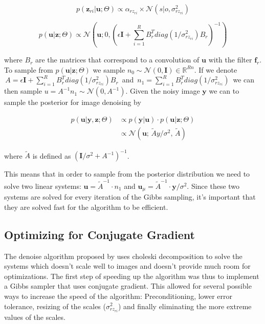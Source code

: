 \documentclass{article}
\begin{document}
\begin{equation}
	p(\textbf{z}_{ri}|\textbf{u};\Theta) \propto \alpha_{rz_{ri}} \times 
	\mathcal{N}(s|o, \sigma^2_{rz_{ri}})
\end{equation}

\begin{equation}
	p(\textbf{u}|\textbf{z};\Theta) \propto \mathcal{N}\left(\textbf{u}; 
	0, \left( \epsilon \textbf{I} + \sum_{i=1}^{R}B_r^T 
	diag(1/\sigma^2_{rz_{ri}}) B_r \right)^{-1} \right)
\end{equation}

where $B_r$ are the matrices that correspond to a convolution of 
$\textbf{u}$ with the filter $\textbf{f}_r$. To sample from 
$p(\textbf{u}|\textbf{z};\Theta)$ we sample $n_0 \sim \mathcal{N}(0, 
\textbf{I}) \in \mathbb{R}^{Rn}$. If we denote $\,A = \epsilon 
\textbf{I} + \sum_{i=1}^{R} B_r^T diag(1/\sigma^2_{rz_{ri}}) B_r\,$ and 
$\,n_1 = \sum_{i=1}^{R} B_r^T diag(1/\sigma^2_{rz_{ri}})\,$ we can then 
sample $u = A^{-1} n_1 \sim \mathcal{N}(0, A^{-1})$. Given the noisy 
image $\textbf{y}$ we can to sample the posterior for image denoising by

\begin{align}
	p(\textbf{u}| \textbf{y}, \textbf{z}; \Theta) & \propto 
	p(\textbf{y}|\textbf{u}) \cdot p(\textbf{u}|\textbf{z};\Theta) \\
	& \propto \mathcal{N} \left( \textbf{u} ; \, \tilde{A} y / \sigma^2, 
	\, \tilde{A}\right)
\end{align}

where $\tilde{A}$ is defined as $(\textbf{I}/\sigma^2 + A^{-1})^{-1}$.

This means that in order to sample from the posterior distribution we 
need to solve two linear systems: $\textbf{u} = \tilde{A}^{-1} \cdot 
n_1$ and $\textbf{u}_{\mu} = \tilde{A}^{-1} \cdot \textbf{y}/\sigma^2$.  
Since these two systems are solved for every iteration of the Gibbs 
sampling, it's important that they are solved fast for the algorithm to 
be efficient.  

\subsection{Optimizing for Conjugate Gradient}

The denoise algorithm proposed by \citep{uwe} uses choleski 
decomposition to solve the systems which doesn't scale well to images 
and doesn't provide much room for optimizations. The first step of 
speeding up the algorithm was thus to implement a Gibbs sampler that 
uses conjugate gradient. This allowed for several possible ways to 
increase the speed of the algorithm: Preconditioning, lower error 
tolerance, resizing of the scales ($\sigma^2_{rz_{ri}}$) and finally 
eliminating the more extreme values of the scales.
\end{document}
